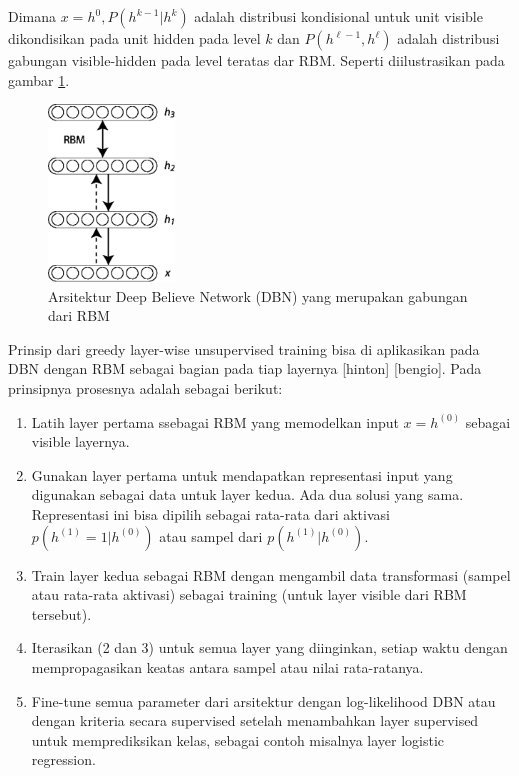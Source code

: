 Dimana $x=h^0, P(h^{k-1} | h^k)$ adalah distribusi kondisional untuk unit visible dikondisikan pada unit hidden pada level $k$ dan  $P(h^{\ell-1}, h^{\ell})$ adalah distribusi gabungan visible-hidden pada level teratas dar RBM. Seperti diilustrasikan pada gambar \ref{fig:dbn3}.

\begin{figure}
	\centering
	\includegraphics[width=0.3\textwidth]
		{pics/DBN3.png}
	\caption{Arsitektur Deep Believe Network (DBN) yang merupakan gabungan dari RBM}
	\label{fig:dbn3}
\end{figure}


Prinsip dari greedy layer-wise unsupervised training bisa di aplikasikan pada DBN dengan RBM sebagai bagian pada tiap layernya [hinton] [bengio]. Pada prinsipnya prosesnya adalah sebagai berikut:
\begin{enumerate}
\item Latih layer pertama ssebagai RBM yang memodelkan input $x = h^{(0)}$ sebagai visible layernya.
\item Gunakan layer pertama untuk mendapatkan representasi input yang digunakan sebagai data untuk layer kedua. Ada dua solusi yang sama. Representasi ini bisa dipilih sebagai rata-rata dari aktivasi $p(h^{(1)}=1|h^{(0)})$ atau sampel dari $p(h^{(1)}|h^{(0)})$.
\item Train layer kedua sebagai RBM dengan mengambil data transformasi (sampel atau rata-rata aktivasi) sebagai training (untuk layer visible dari RBM tersebut).
\item Iterasikan (2 dan 3) untuk semua layer yang diinginkan, setiap waktu dengan mempropagasikan keatas antara sampel atau nilai rata-ratanya.
\item Fine-tune semua parameter dari arsitektur dengan log-likelihood DBN atau dengan kriteria secara supervised setelah menambahkan layer supervised untuk memprediksikan kelas, sebagai contoh misalnya layer logistic regression.
\end{enumerate}

